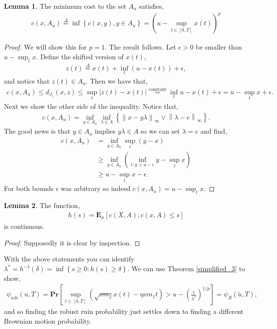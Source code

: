 \documentclass[12pt]{article}
\newcommand\norm[1]{\left\lVert#1\right\rVert}
\renewcommand{\Pr}{\textbf{Pr}}
\newcommand{\E}{\textbf{E}}
\newcommand{\define}{\overset{\Delta}{=}}
\theoremstyle{definition}
\theoremstyle{definition}
\newtheorem{lemma}{Lemma}
\theoremstyle{definition}
\begin{document}
\begin{lemma} The minimum cost to the set $A_u$ satisfies,
\begin{align*}
c(x,A_u) \define\inf\left\{c(x,y),y\in A_u\right\} = \left(u-\sup_{t\in[0,T]}x(t)\right)^p
\end{align*}
\begin{proof}
We will show this for $p=1$. The result follows. Let $\epsilon>0$ be smaller than $u-\sup_t x$. Define the shifted version of $x(t)$,
\begin{align*}
z(t) \define x(t) + \inf_{t}\left(u-x(t)\right)+ \epsilon,
\end{align*}
and notice that $z(t)\in A_u$. Then we have that,
\begin{align*}
c(x,A_u)\leq d_{J_1}(x,z)\leq \sup_t |z(t)-x(t)| \overset{\text{constant}}{=} \inf_t u- x(t)+\epsilon= u-\sup_t x+\epsilon.
\end{align*}
Next we show the other side of the inequality. Notice that,
\begin{align*}
c(x,A_u) = \inf_{y\in A_u}\inf_{\lambda\in \Lambda}\left\{\norm{x-y\lambda}_{\infty}\lor \norm{\lambda-e}_{\infty}\right\}.
\end{align*}
The good news is that $y\in A_u$ implies $y\lambda\in A$ so we can set $\lambda = e$ and find,
\begin{align*}
c(x,A_u) &= \inf_{y\in A_u} \sup_t (y-x)\\
&\geq \inf_{y\in A_u}\left(\inf_{t: y>u-\epsilon} y - \sup_t x\right)\\
&\geq u-\sup_t x-\epsilon.
\end{align*}
For both bounds $\epsilon$ was arbitrary so indeed $c(x,A_u)= u-\sup_t x$.
\end{proof}
\end{lemma}

\begin{lemma} The function,
\begin{align*}
h(s)=\E_{\mu}\left[c(X,A); c(x,A)\leq s\right]
\end{align*}
is continuous. 
\end{lemma}
\begin{proof} Supposedly it is clear by inspection.
\end{proof}

With the above statements you can identify $\lambda^*=h^{-1}(\delta)=\inf\left\{s\geq 0 : h(s)\geq \delta\right\}$. We can use Theorem \ref{simplified_3} to show,
\begin{align}
\psi_{\text{rob}}(u,T)= \Pr\left[\sup_{t\in[0,T]} \left(\sqrt{\nu m_2}x(t)-\eta \nu m_1t\right)>u -\left(\frac{1}{\lambda^*}\right)^{1/p}\right] = \psi_B(\tilde u, T),\label{Brownian_robust}
\end{align}
and so finding the robust ruin probability just settles down to finding a different Brownian motion probability. 
\end{document}
